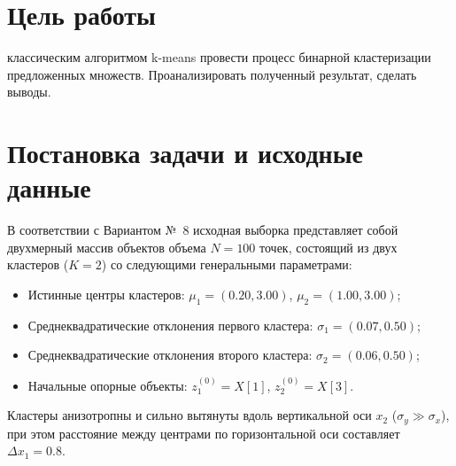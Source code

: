 \documentclass{bmstu-sob}
\begin{document}
	
	
	
	
	\section{Цель работы}
	
	классическим алгоритмом k-means провести процесс бинарной кластеризации предложенных множеств. Проанализировать полученный результат, сделать выводы.
	
	
	\section{Постановка задачи и исходные данные}
	
	В соответствии с Вариантом №~8 исходная выборка представляет собой двухмерный массив объектов объема $N = 100$ точек, состоящий из двух кластеров ($K = 2$) со следующими генеральными параметрами:
	\begin{itemize}
		\item Истинные центры кластеров: $\mu_1 = (0.20, 3.00)$, $\mu_2 = (1.00, 3.00)$;
		\item Среднеквадратические отклонения первого кластера: $\sigma_1 = (0.07, 0.50)$;
		\item Среднеквадратические отклонения второго кластера: $\sigma_2 = (0.06, 0.50)$;
		\item Начальные опорные объекты: $z_1^{(0)} = X[1]$, $z_2^{(0)} = X[3]$.
	\end{itemize}
	
	Кластеры анизотропны и сильно вытянуты вдоль вертикальной оси $x_2$ ($\sigma_y \gg \sigma_x$), при этом расстояние между центрами по горизонтальной оси составляет $\Delta x_1 = 0.8$.
	
	
\end{document}
